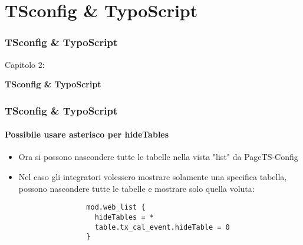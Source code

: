 %

\section{TSconfig \& TypoScript}
\begin{frame}[fragile]
	\frametitle{TSconfig \& TypoScript}

	\begin{center}\huge{Capitolo 2:}\end{center}
	\begin{center}\huge{\color{typo3darkgrey}\textbf{TSconfig \& TypoScript}}\end{center}

\end{frame}

\begin{frame}[fragile]
	\frametitle{TSconfig \& TypoScript}
	\framesubtitle{Possibile usare asterisco per hideTables}

	\lstset{basicstyle=\tiny\ttfamily}

	\begin{itemize}
		\item Ora si possono nascondere tutte le tabelle nella vista "list" da
			PageTS-Config

		\item Nel caso gli integratori volessero mostrare solamente una specifica tabella,
			possono nascondere tutte le tabelle e mostrare solo quella voluta:

			\begin{lstlisting}
				mod.web_list {
				  hideTables = *
				  table.tx_cal_event.hideTable = 0
				}
			\end{lstlisting}

	\end{itemize}

\end{frame}

